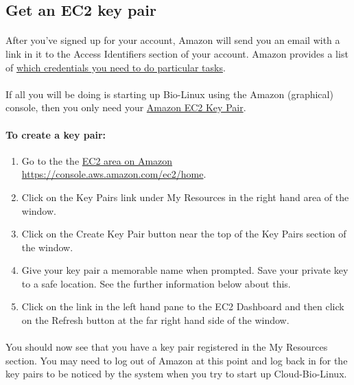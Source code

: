 \subsection{Get an EC2 key pair}

\paragraph{}After you've signed up for your account, Amazon will send you an email with a link in it to the Access Identifiers section of your account. Amazon provides a list of \href{http://docs.amazonwebservices.com/AWSSecurityCredentials/1.0/AboutAWSCredentials.html#EC2Credentials}{which credentials you need to do particular tasks}. 

\paragraph{}If all you will be doing is starting up Bio-Linux using the Amazon (graphical) console, then you only need your \href{http://docs.amazonwebservices.com/AWSSecurityCredentials/1.0/AboutAWSCredentials.html#EC2KeyPairs}{Amazon EC2 Key Pair}. 


\paragraph{To create a key pair:}
\begin{enumerate}
\item Go to the the \href{https://console.aws.amazon.com/ec2/home}{EC2 area on Amazon https://console.aws.amazon.com/ec2/home}.
\item Click on the Key Pairs link under My Resources in the right hand area of the window. 
\item Click on the Create Key Pair button near the top of the Key Pairs section of the window.
\item Give your key pair a memorable name when prompted. Save your private key to a safe location. See the further information below about this. 
\item Click on the link in the left hand pane to the EC2 Dashboard and then click on the Refresh button at the far right hand side of the window. 
\end{enumerate}

\paragraph{}You should now see that you have a key pair registered in the My Resources section. 
You may need to log out of Amazon at this point and log back in for the key pairs to be noticed by the system when you try to start up Cloud-Bio-Linux. 


